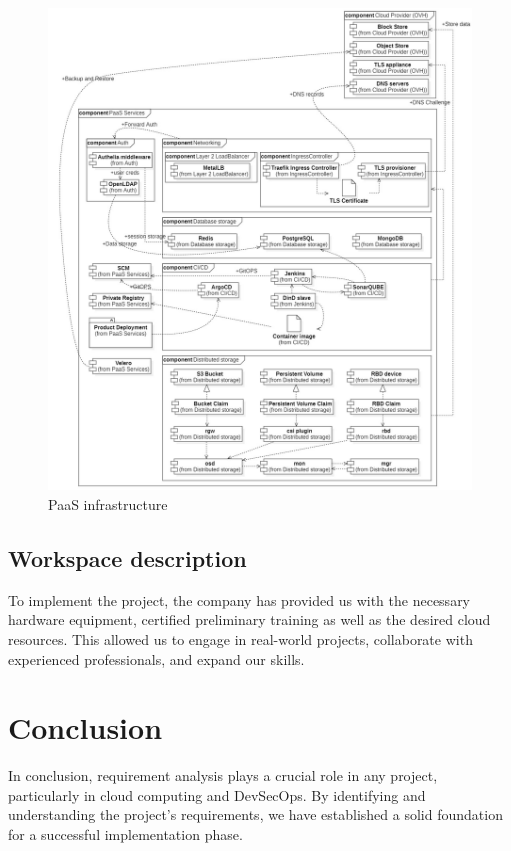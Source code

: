 \begin{figure}[H]\centering
\includegraphics[width=1.0\textwidth,angle=00]{assets/f8.jpg}
\caption{PaaS infrastructure}
\label{fig:f8}
\end{figure}

\newpage

\subsection{Workspace description}

\hspace{7mm}To implement the project, the company has provided us with the necessary hardware equipment, certified preliminary training as well as the desired cloud resources. This allowed us to engage in real-world projects, collaborate with experienced professionals, and expand our skills.

\section*{Conclusion}
\hspace{7mm}In conclusion, requirement analysis plays a crucial role in any project, particularly in cloud computing and DevSecOps. By identifying and understanding the project's requirements, we have established a solid foundation for a successful implementation phase.

